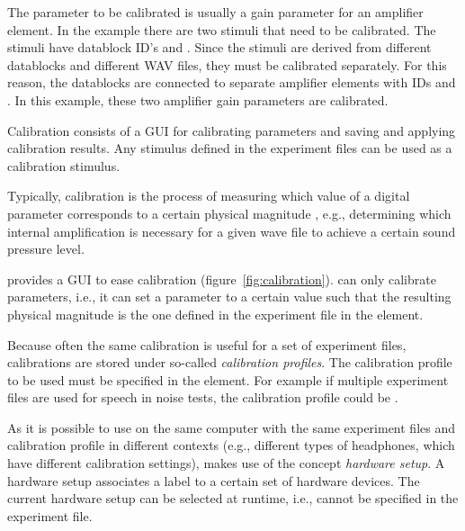 The parameter to be calibrated is usually a gain parameter for an amplifier element. In the example there are two stimuli that need to be calibrated. The stimuli have datablock ID’s  and . Since the stimuli are derived from different datablocks and different WAV files, they must be calibrated separately.  For this reason, the datablocks are connected to separate amplifier elements with IDs  and . In this example, these two amplifier gain parameters are calibrated.

Calibration consists of a GUI for calibrating parameters and saving and applying
calibration results. Any stimulus defined in the experiment files can be used as a calibration stimulus.

Typically, calibration is the process of measuring which value of
a digital parameter corresponds to a certain physical magnitude ,
e.g., determining which internal amplification is necessary for a
given wave file to achieve a certain sound pressure level.

\apex provides a GUI to ease calibration (figure~\ref{fig:calibration}). 
\apex can only calibrate parameters, i.e., it can set a parameter
to a certain value such that the resulting physical magnitude is
the one defined in the experiment file in the
 element.

Because often the same calibration is useful for a set of
experiment files, calibrations are stored under so-called
\emph{calibration profiles}. The calibration profile to be used
must be specified in the  element. For
example if multiple experiment files are used for speech in noise
tests, the calibration profile could be .

As it is possible to use \apex on the same computer with the same
experiment files and calibration profile in different contexts (e.g., different types of
headphones, which have different calibration settings), \apex
makes use of the concept \emph{hardware setup}. A hardware setup
associates a label to a certain set of hardware devices. The
current hardware setup can be selected at runtime, i.e., cannot be
specified in the experiment file.

